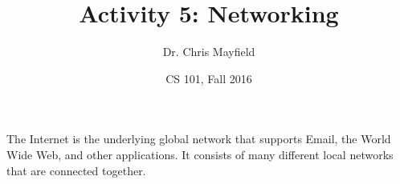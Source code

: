 \documentclass[12pt]{article}
\title{Activity 5: Networking}
\author{Dr. Chris Mayfield}
\date{CS 101, Fall 2016}
\begin{document}
\maketitle

The Internet is the underlying global network that supports Email, the World Wide Web, and other applications. It consists of many different local networks that are connected together. 


\newpage

\end{document}
